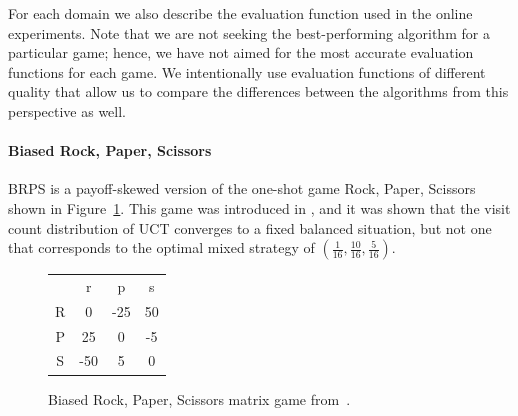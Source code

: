 For each domain we also describe the evaluation function used in the online experiments.
Note that we are not seeking the best-performing algorithm for a particular game; hence, we have not aimed for the most accurate evaluation functions for each game.
We intentionally use evaluation functions of different quality that allow us to compare the differences between the algorithms from this perspective as well.

\paragraph{\textbf{Biased Rock, Paper, Scissors}}

BRPS is a payoff-skewed version of the one-shot game Rock, Paper, Scissors shown in
Figure~\ref{fig:brps}. This game was introduced in \cite{Shafiei09}, and it was shown that the visit count
distribution of UCT converges to a fixed balanced situation, but not one that
corresponds to the optimal mixed strategy of $(\frac{1}{16},\frac{10}{16},\frac{5}{16})$.


\begin{figure}[h!]
\begin{center}
\begin{tabular}{c|c|c|c|}
 \multicolumn{1}{c}{~} & \multicolumn{1}{c}{r}  &  \multicolumn{1}{c}{p} &  \multicolumn{1}{c}{s}\\\cline{2-4}
R &  0  & -25& 50\\\cline{2-4}
P &  25 &  0 & -5\\\cline{2-4}
S & -50 &  5 &  0\\\cline{2-4}
\end{tabular}
\end{center}
\caption{Biased Rock, Paper, Scissors matrix game from~\cite{Shafiei09}. \label{fig:brps}}
\end{figure}

